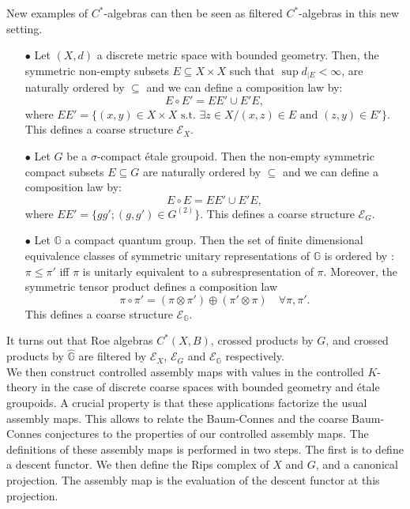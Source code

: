 New examples of $C^*$-algebras can then be seen as filtered $C^*$-algebras in this new setting. \\

\begin{itemize} 
\item[$\bullet$] Let $(X,d)$ a discrete metric space with bounded geometry. Then, the symmetric non-empty subsets $E\subseteq X\times X$ such that $\sup d_{|E}<\infty$, are naturally ordered by $\subseteq$ and we can define a composition law by:
\[E\circ E' = EE'\cup E'E,\]
where $EE' = \{(x,y)\in X\times X \text{ s.t. }\exists z\in X / (x,z)\in E \text{ and }(z,y)\in E'\}$. This defines a coarse structure $\mathcal E_X$.
\item[$\bullet$] Let $G$ be a $\sigma$-compact étale groupoid. Then the non-empty symmetric compact subsets $E\subseteq G$ are naturally ordered by $\subseteq$ and we can define a composition law by:
\[E\circ E = EE'\cup E'E,\]
where $EE' = \{gg' ; (g,g')\in G^{(2)}\}$. This defines a coarse structure $\mathcal E_G$.
\item[$\bullet$] Let $\mathbb G$ a compact quantum group. Then the set of finite dimensional equivalence classes of symmetric unitary representations of $\mathbb G$ is ordered by : $\pi\leq \pi'$ iff $\pi$ is unitarly equivalent to a subrespresentation of $\pi$. Moreover, the symmetric tensor product defines a composition law
\[\pi\circ \pi' = (\pi\otimes\pi' )\oplus (\pi'\otimes \pi) \quad \forall \pi,\pi'.\] This defines a coarse structure $\mathcal E_{\mathbb G}$.\\
\end{itemize} 

It turns out that Roe algebras $C^*(X,B)$, crossed products by $G$, and crossed products by $\hat{\mathbb G}$ are filtered by $\mathcal E_X$, $\mathcal E_G$ and $\mathcal E_{\mathbb G}$ respectively.\\

We then construct controlled assembly maps with values in the controlled $K$-theory in the case of discrete coarse spaces with bounded geometry and étale groupoids. A crucial property is that these applications factorize the usual assembly maps. This allows to relate the Baum-Connes and the coarse Baum-Connes conjectures to the properties of our controlled assembly maps. The definitions of these assembly maps is performed in two steps. The first is to define a descent functor. We then define the Rips complex of $X$ and $G$, and a canonical projection. The assembly map is the evaluation of the descent functor at this projection. \\

